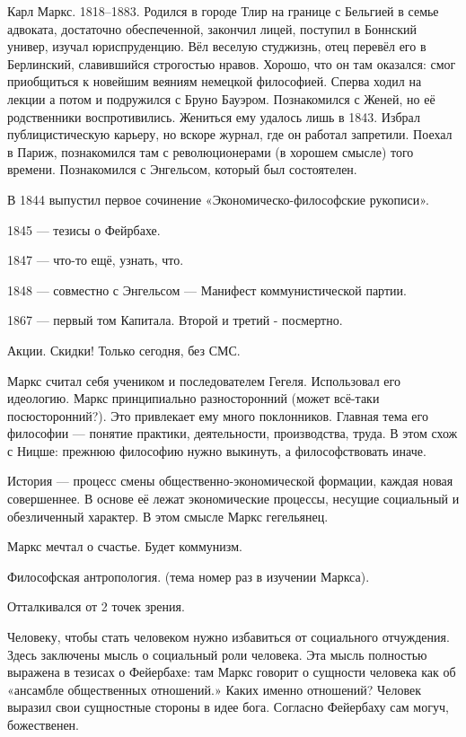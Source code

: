 
Карл Маркс. 1818--1883. Родился в городе Тлир на границе с Бельгией в семье адвоката, достаточно обеспеченной, закончил лицей, поступил в Боннский универ, изучал юриспруденцию. 
Вёл веселую студжизнь, отец перевёл его в Берлинский, славившийся строгостью нравов. Хорошо, что он там оказался: смог приобщиться к новейшим веяниям немецкой философией. 
Сперва ходил на лекции а потом и подружился с Бруно Бауэром. Познакомился с Женей, но её родственники воспротивились. Жениться ему удалось лишь в 1843.
Избрал публицистическую карьеру, но вскоре журнал, где он работал запретили. Поехал в Париж, познакомился там с революционерами (в хорошем смысле) того времени. Познакомился с Энгельсом, который был состоятелен. 

В 1844 выпустил первое сочинение «Экономическо-философские рукописи».

1845 --- тезисы о Фейрбахе.

1847 --- что-то ещё, узнать, что.

1848 --- совместно с Энгельсом --- Манифест коммунистической партии.

1867 --- первый том Капитала. Второй и третий - посмертно.

Акции. Скидки! Только сегодня, без СМС.

Маркс считал себя учеником и последователем Гегеля. Использовал его идеологию. Маркс принципиально разносторонний (может всё-таки посюсторонний?). Это привлекает ему много поклонников. Главная тема его философии --- понятие практики, деятельности, производства, труда. В этом схож с Ницше: прежнюю философию нужно выкинуть, а философствовать иначе.

История --- процесс смены общественно-экономической формации, каждая новая совершеннее. В основе её лежат экономические процессы, несущие социальный и обезличенный характер. В этом смысле Маркс гегельянец. 

Маркс мечтал о счастье.
Будет коммунизм.

Философская антропология. (тема номер раз в изучении Маркса).

Отталкивался от 2 точек зрения.

Человеку, чтобы стать человеком нужно избавиться от социального отчуждения. Здесь заключены мысль о социальный роли человека. Эта мысль полностью выражена в тезисах о Фейербахе: там Маркс говорит о сущности человека как об «ансамбле общественных отношений.» Каких именно отношений? Человек выразил свои сущностные стороны в идее бога. Согласно Фейербаху сам могуч, божественен. 

